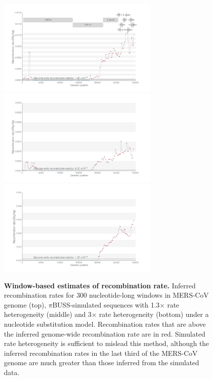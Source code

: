 \documentclass[11pt,oneside,letterpaper]{article}
\begin{document}
\begin{figure}[h]
	\centering	
	\includegraphics[width=0.7\textwidth]{figures/supp_MERS_LDhat_windowRho.png}
	\includegraphics[width=0.7\textwidth]{figures/supp_pibuss_1.3_LDhat_windowRho.png}
	\includegraphics[width=0.7\textwidth]{figures/supp_pibuss_3_LDhat_windowRho.png}
	\caption{\textbf{Window-based estimates of recombination rate.}
Inferred recombination rates for 300 nucleotide-long windows in MERS-CoV genome (top), $\pi$BUSS-simulated sequences with 1.3$\times$ rate heterogeneity (middle) and 3$\times$ rate heterogeneity (bottom) under a nucleotide substitution model.
Recombination rates that are above the inferred genome-wide recombination rate are in red.
Simulated rate heterogeneity is sufficient to mislead this method, although the inferred recombination rates in the last third of the MERS-CoV genome are much greater than those inferred from the simulated data.}
	\label{rho}
\end{figure}
\end{document}
